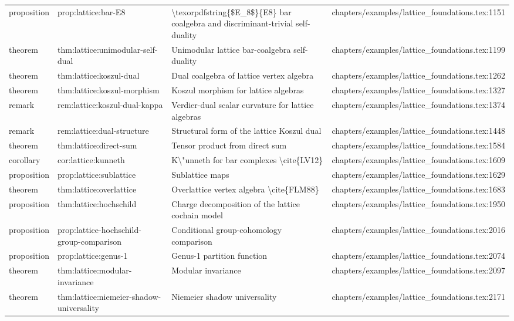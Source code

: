 \documentclass[11pt]{article}
\begin{document}
\begin{longtable}{L{0.10\textwidth}L{0.26\textwidth}L{0.42\textwidth}L{0.22\textwidth}}
proposition & prop:lattice:bar-E8 & \textbackslash{}texorpdfstring\{\$E\_8\$\}\{E8\} bar coalgebra and discriminant-trivial self-duality & chapters/examples/lattice\_foundations.tex:1151\\
theorem & thm:lattice:unimodular-self-dual & Unimodular lattice bar-coalgebra self-duality & chapters/examples/lattice\_foundations.tex:1199\\
theorem & thm:lattice:koszul-dual & Dual coalgebra of lattice vertex algebra & chapters/examples/lattice\_foundations.tex:1262\\
theorem & thm:lattice:koszul-morphism & Koszul morphism for lattice algebras & chapters/examples/lattice\_foundations.tex:1327\\
remark & rem:lattice:koszul-dual-kappa & Verdier-dual scalar curvature for lattice algebras & chapters/examples/lattice\_foundations.tex:1374\\
remark & rem:lattice:dual-structure & Structural form of the lattice Koszul dual & chapters/examples/lattice\_foundations.tex:1448\\
theorem & thm:lattice:direct-sum & Tensor product from direct sum & chapters/examples/lattice\_foundations.tex:1584\\
corollary & cor:lattice:kunneth & K\textbackslash{}"unneth for bar complexes \textbackslash{}cite\{LV12\} & chapters/examples/lattice\_foundations.tex:1609\\
proposition & prop:lattice:sublattice & Sublattice maps & chapters/examples/lattice\_foundations.tex:1629\\
theorem & thm:lattice:overlattice & Overlattice vertex algebra \textbackslash{}cite\{FLM88\} & chapters/examples/lattice\_foundations.tex:1683\\
proposition & thm:lattice:hochschild & Charge decomposition of the lattice cochain model & chapters/examples/lattice\_foundations.tex:1950\\
proposition & prop:lattice-hochschild-group-comparison & Cond{}itional group-cohomology comparison & chapters/examples/lattice\_foundations.tex:2016\\
proposition & prop:lattice:genus-1 & Genus-1 partition function & chapters/examples/lattice\_foundations.tex:2074\\
theorem & thm:lattice:modular-invariance & Modular invariance & chapters/examples/lattice\_foundations.tex:2097\\
theorem & thm:lattice:niemeier-shadow-universality & Niemeier shadow universality & chapters/examples/lattice\_foundations.tex:2171\\

\end{longtable}
\end{document}
